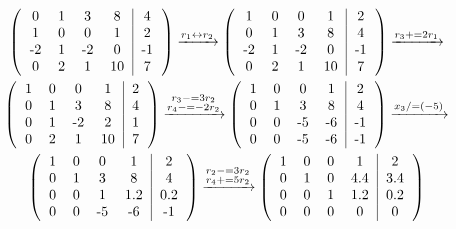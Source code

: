 \documentclass{article}
\begin{document}
\begin{gather*}
    \left(
        \begin{tabular}{ c c c c|c }
            0 & 1 & 3 & 8 & 4\\
            1 & 0 & 0 & 1 & 2\\
            -2 & 1 & -2 & 0 & -1\\
            0 & 2 & 1 & 10 & 7
        \end{tabular}
    \right)
    \xrightarrow{r_1 \leftrightarrow r_2}
    \left(
        \begin{tabular}{ c c c c|c }
            1 & 0 & 0 & 1 & 2\\
            0 & 1 & 3 & 8 & 4\\
            -2 & 1 & -2 & 0 & -1\\
            0 & 2 & 1 & 10 & 7
        \end{tabular}
    \right)
    \xrightarrow{r_3 += 2r_1}
    \\
    \left(
        \begin{tabular}{ c c c c|c }
            1 & 0 & 0 & 1 & 2\\
            0 & 1 & 3 & 8 & 4\\
            0 & 1 & -2 & 2 & 1\\
            0 & 2 & 1 & 10 & 7
        \end{tabular}
    \right)
    \xrightarrow{
        \substack{
            r_3 -= 3r_2\\
            r_4 -= -2r_2
        }
    }
    \left(
        \begin{tabular}{ c c c c|c }
            1 & 0 & 0 & 1 & 2\\
            0 & 1 & 3 & 8 & 4\\
            0 & 0 & -5 & -6 & -1\\
            0 & 0 & -5 & -6 & -1
        \end{tabular}
    \right)
    \xrightarrow{x_3 /= (-5)}
    \\
    \left(
        \begin{tabular}{ c c c c|c }
            1 & 0 & 0 & 1 & 2\\
            0 & 1 & 3 & 8 & 4\\
            0 & 0 & 1 & 1.2 & 0.2\\
            0 & 0 & -5 & -6 & -1
        \end{tabular}
    \right)
    \xrightarrow{
        \substack{
            r_2 -= 3r_2\\
            r_4 += 5r_2
        }
    }
    \left(
        \begin{tabular}{ c c c c|c }
            1 & 0 & 0 & 1 & 2\\
            0 & 1 & 0 & 4.4 & 3.4\\
            0 & 0 & 1 & 1.2 & 0.2\\
            0 & 0 & 0 & 0 & 0
        \end{tabular}
    \right)
\end{gather*}
\end{document}
